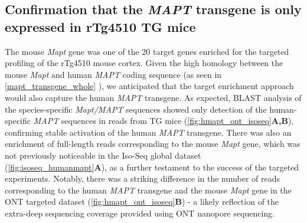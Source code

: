 \newpage
\subsection{Confirmation that the \textit{MAPT} transgene is only expressed in rTg4510 TG mice}
The mouse \textit{Mapt} gene was one of the 20 target genes enriched for the targeted profiling of the rTg4510 mouse cortex. Given the high homology between the mouse \textit{Mapt} and human \textit{MAPT} coding sequence (as seen in \cref{mapt_transgene_whole} ), we anticipated that the target enrichment approach would also capture the human \textit{MAPT} transgene. As expected, BLAST analysis of the species-specific \textit{Mapt/MAPT} sequences showed only detection of the human-specific \textit{MAPT} sequences in reads from TG mice (\cref{fig:hmapt_ont_isoseq}\textbf{A,B}), confirming stable activation of the human \textit{MAPT} transgene. There was also an enrichment of full-length reads corresponding to the mouse \textit{Mapt} gene, which was not previously noticeable in the Iso-Seq global dataset (\cref{fig:isoseq_humanmapt}\textbf{A}), as a further testament to the success of the targeted experiments. Notably, there was a striking difference in the number of reads corresponding to the human \textit{MAPT} transgene and the mouse \textit{Mapt} gene in the ONT targeted dataset (\cref{fig:hmapt_ont_isoseq}\textbf{B}) - a likely reflection of the extra-deep sequencing coverage provided using ONT nanopore sequencing. 

